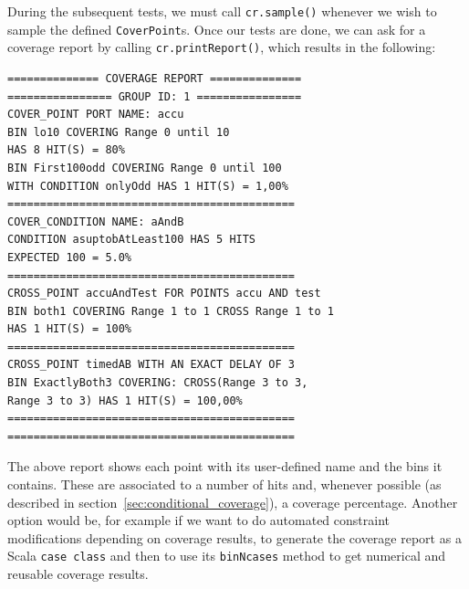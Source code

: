 \documentclass[conference]{IEEEtran}
\begin{document}
During the subsequent tests, we must call \texttt{cr.sample()} whenever we wish to sample the defined \texttt{CoverPoint}s. %
Once our tests are done, we can ask for a coverage report by calling \texttt{cr.printReport()}, which results in the following: 
\begin{verbatim}
============== COVERAGE REPORT ==============
================ GROUP ID: 1 ================
COVER_POINT PORT NAME: accu
BIN lo10 COVERING Range 0 until 10 
HAS 8 HIT(S) = 80%
BIN First100odd COVERING Range 0 until 100 
WITH CONDITION onlyOdd HAS 1 HIT(S) = 1,00%
============================================
COVER_CONDITION NAME: aAndB
CONDITION asuptobAtLeast100 HAS 5 HITS 
EXPECTED 100 = 5.0%
============================================
CROSS_POINT accuAndTest FOR POINTS accu AND test
BIN both1 COVERING Range 1 to 1 CROSS Range 1 to 1 
HAS 1 HIT(S) = 100%
============================================
CROSS_POINT timedAB WITH AN EXACT DELAY OF 3
BIN ExactlyBoth3 COVERING: CROSS(Range 3 to 3, 
Range 3 to 3) HAS 1 HIT(S) = 100,00%
============================================
============================================
\end{verbatim}
The above report shows each point with its user-defined name and the bins it contains. These are associated to a number of hits and, whenever possible (as described in section~\ref{sec:conditional_coverage}), a coverage percentage.
Another option would be, for example if we want to do automated constraint modifications depending on coverage results, to generate the coverage report as a Scala \texttt{case class} and then to use its \texttt{binNcases} method to get numerical and reusable coverage results.  
\end{document}
